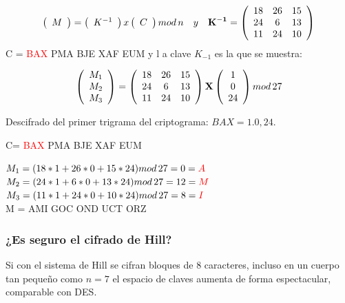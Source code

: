 \documentclass{article}
\begin{document}
\begin{equation*}
    \left( \begin{array}{c}
    M 
    \end{array} \right)= \left(
    \begin{array}{c}
    K^{-1}
    \end{array}\right)x
    \left(
    \begin{array}{c}
    C
    \end{array}\right) mod \thinspace n \quad y \quad
    \mathbf{K^{-1}} = \left( \begin{array}{ccc}
    18 & 26 & 15 \\
    24 & 6 & 13 \\
    11 & 24 & 10
    \end{array}   \right)
\end{equation*}
C = \textcolor{red}{BAX} PMA BJE XAF EUM y l a clave $K_{-1}$ es la que se muestra:

\begin{equation*}
    \left(
    \begin{array}{c}
    M_1  \\
    M_2  \\
    M_3 
    \end{array} \right) = \left(
    \begin{array}{ccc}
    18 & 26 & 15\\
    24 & 6 & 13\\
    11 & 24 & 10 
    \end{array}
    \right) \mathbf{X} \left(
    \begin{array}{c}
    1 \\
    0\\
    24
    \end{array}
    \right) mod \thinspace 27
\end{equation*}

Descifrado del primer trigrama del criptograma: $BAX = 1. 0, 24$. 

C= \textcolor{red}{BAX} PMA BJE XAF EUM

$M_1 = (18 * 1 + 26 * 0 + 15 * 24) mod \thinspace 27 = 0 = \textcolor{red}{A}$ \\
$M_2 = (24 * 1 + 6 * 0 + 13 * 24) mod \thinspace 27 = 12 = \textcolor{red}{M}$\\
$M_3 = (11 * 1 + 24 * 0 + 10 * 24) mod \thinspace 27 = 8 = \textcolor{red}{I}$\\

M = AMI GOC OND UCT ORZ

\subsubsection{¿Es seguro el cifrado de Hill?}
\justify
Si con el sistema de Hill se cifran bloques de 8 caracteres, incluso en un cuerpo tan pequeño como $n = 7$ el espacio de claves aumenta de forma espectacular, comparable con DES.
\end{document}
